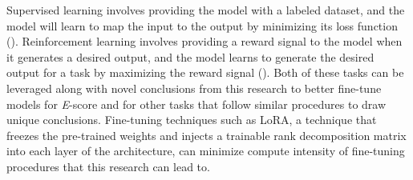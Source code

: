 Supervised learning involves providing the model with a labeled dataset, and the model will learn to map the input to the output by minimizing its loss function (\cite{Mohri:2018}). Reinforcement learning involves providing a reward signal to the model when it generates a desired output, and the model learns to generate the desired output for a task by maximizing the reward signal (\cite{Sutton:1998}). Both of these tasks can be leveraged along with novel conclusions from this research to better fine-tune models for \textit{E}-score and for other tasks that follow similar procedures to draw unique conclusions. Fine-tuning techniques such as \gls{LoRA}, a technique that freezes the pre-trained weights and injects a trainable rank decomposition matrix into each layer of the architecture, can minimize compute intensity of fine-tuning procedures that this research can lead to.